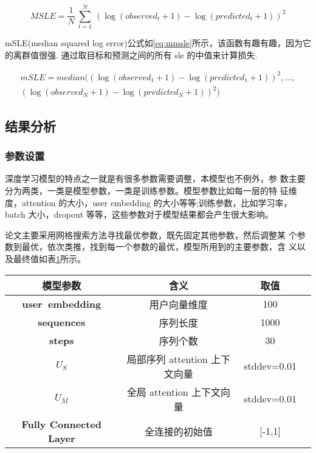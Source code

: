  \begin{equation}\label{eq:msle}
 	MSLE = \frac{1}{N}~\sum_{t=1}^N~(\log{(observed_t + 1)} - \log{(predicted_t + 1)})^2
 \end{equation}
 
 mSLE(median squared log error)公式如\ref{eq:mmsle}所示，该函数有趣有趣，因为它的离群值很强. 通过取目标和预测之间的所有 sle 的中值来计算损失.
 
  \begin{equation}\label{eq:mmsle}
  	\begin{split}
       mSLE = median((\log{(observed_1 + 1)} - \log{(predicted_1 + 1)})^2,...,\\
      ( \log{(observed_N + 1)} - \log{(predicted_N + 1)})^2)
       \end{split}
  \end{equation}

\subsection{结果分析}
\subsubsection{参数设置}
深度学习模型的特点之一就是有很多参数需要调整，本模型也不例外，参 数主要分为两类，一类是模型参数，一类是训练参数。模型参数比如每一层的特 征维度，attention 的大小，user embedding 的大小等等;训练参数，比如学习率， batch 大小，dropout 等等，这些参数对于模型结果都会产生很大影响。

论文主要采用网格搜索方法寻找最优参数，既先固定其他参数，然后调整某 个参数到最优，依次类推，找到每一个参数的最优，模型所用到的主要参数，含 义以及最终值如表\ref{tab:model_1}所示。

\begin{table}[H]
    \centering
    \footnotesize%
      \label{tab:model_1}
    \setlength{\tabcolsep}{30pt}%
    \renewcommand{\arraystretch}{1.2}%
    \begin{tabular}{cccc}
        \hline
        \textbf{模型参数}&\textbf{ 含义}&\textbf{ 取值} \\
        \hline
        \textbf{user~embedding} & 用户向量维度&  100\\
       \textbf{ sequences} &序列长度 &1000 \\
     \textbf{   steps }& 序列个数& 30\\
       \textbf{ $U_{S}$ }&局部序列 attention 上下文向量 & stddev=0.01\\
       \textbf{ $U_{M}$}&全局 attention 上下文向量 & stddev=0.01 \\
\textbf{        Fully Connected Layer} & 全连接的初始值&  [-1,1]\\
        	\hline
    \end{tabular}
    
\end{table}


